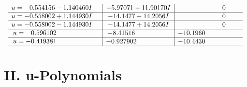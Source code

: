 \documentclass[1p]{elsarticle_modified}
\theoremstyle{definition}
\begin{document}
$$\begin{array}{c|c|c}
\begin{aligned}
u &= \phantom{-}0.554156 - 1.140460 I\end{aligned}
 & -5.97071 - 11.90170 I & \phantom{-0.000000 } 0 \\ \hline\begin{aligned}
u &= -0.558002 + 1.144930 I\end{aligned}
 & -14.1477 - 14.2056 I & \phantom{-0.000000 } 0 \\ \hline\begin{aligned}
u &= -0.558002 - 1.144930 I\end{aligned}
 & -14.1477 + 14.2056 I & \phantom{-0.000000 } 0 \\ \hline\begin{aligned}
u &= \phantom{-}0.596102\phantom{ +0.000000I}\end{aligned}
 & -8.41516\phantom{ +0.000000I} & -10.1960\phantom{ +0.000000I} \\ \hline\begin{aligned}
u &= -0.419381\phantom{ +0.000000I}\end{aligned}
 & -0.927902\phantom{ +0.000000I} & -10.4430\phantom{ +0.000000I}\\
 \hline 
 \end{array}$$\newpage
\newpage\renewcommand{\arraystretch}{1}
\centering \section*{ II. u-Polynomials}
\end{document}
